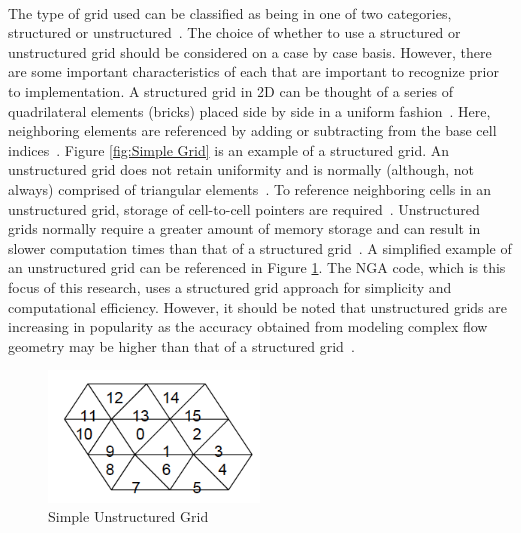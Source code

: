 \paragraph{} The type of grid used can be classified as being in one of two categories, structured or unstructured~\cite{anderson}. The choice of whether to use a structured or unstructured grid should be considered on a case by case basis. However, there are some important characteristics of each that are important to recognize prior to implementation. A structured grid in 2D can be thought of a series of quadrilateral elements (bricks) placed side by side in a uniform fashion~\cite{MIT}. Here, neighboring elements are referenced by adding or subtracting from the base cell indices~\cite{anderson}. Figure \ref{fig:Simple Grid} is an example of a structured grid. An unstructured grid does not retain uniformity and is normally (although, not always) comprised of triangular elements~\cite{tu}. To reference neighboring cells in an unstructured grid, storage of cell-to-cell pointers are required~\cite{MIT}. Unstructured grids normally require a greater amount of memory storage and can result in slower computation times than that of a structured grid~\cite{magoules}. A simplified example of an unstructured grid can be referenced in Figure \ref{fig:Unstructured Grid}. The NGA code, which is this focus of this research, uses a structured grid approach for simplicity and computational efficiency. However, it should be noted that unstructured grids are increasing in popularity as the accuracy obtained from modeling complex flow geometry may be higher than that of a structured grid~\cite{Hirt1981}. 

\begin{figure}[htbp]
	\centering
	\includegraphics[width=0.5\textwidth]{figs/unstruc}
	\caption{Simple Unstructured Grid \cite{MIT}}
	\label{fig:Unstructured Grid}
\end{figure}

